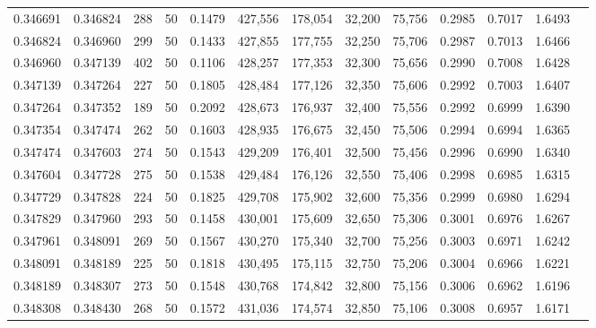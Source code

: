 \begin{tabular}{rrrrrrrrrrrrr}
0.346691 & 0.346824 &   288 &  50 &                                     0.1479 & 427,556 & 178,054 &  32,200 &  75,756 & 0.2985 & 0.7017 & 1.6493 \\
0.346824 & 0.346960 &   299 &  50 &                                     0.1433 & 427,855 & 177,755 &  32,250 &  75,706 & 0.2987 & 0.7013 & 1.6466 \\
0.346960 & 0.347139 &   402 &  50 &                                     0.1106 & 428,257 & 177,353 &  32,300 &  75,656 & 0.2990 & 0.7008 & 1.6428 \\
0.347139 & 0.347264 &   227 &  50 &                                     0.1805 & 428,484 & 177,126 &  32,350 &  75,606 & 0.2992 & 0.7003 & 1.6407 \\
0.347264 & 0.347352 &   189 &  50 &                                     0.2092 & 428,673 & 176,937 &  32,400 &  75,556 & 0.2992 & 0.6999 & 1.6390 \\
0.347354 & 0.347474 &   262 &  50 &                                     0.1603 & 428,935 & 176,675 &  32,450 &  75,506 & 0.2994 & 0.6994 & 1.6365 \\
0.347474 & 0.347603 &   274 &  50 &                                     0.1543 & 429,209 & 176,401 &  32,500 &  75,456 & 0.2996 & 0.6990 & 1.6340 \\
0.347604 & 0.347728 &   275 &  50 &                                     0.1538 & 429,484 & 176,126 &  32,550 &  75,406 & 0.2998 & 0.6985 & 1.6315 \\
0.347729 & 0.347828 &   224 &  50 &                                     0.1825 & 429,708 & 175,902 &  32,600 &  75,356 & 0.2999 & 0.6980 & 1.6294 \\
0.347829 & 0.347960 &   293 &  50 &                                     0.1458 & 430,001 & 175,609 &  32,650 &  75,306 & 0.3001 & 0.6976 & 1.6267 \\
0.347961 & 0.348091 &   269 &  50 &                                     0.1567 & 430,270 & 175,340 &  32,700 &  75,256 & 0.3003 & 0.6971 & 1.6242 \\
0.348091 & 0.348189 &   225 &  50 &                                     0.1818 & 430,495 & 175,115 &  32,750 &  75,206 & 0.3004 & 0.6966 & 1.6221 \\
0.348189 & 0.348307 &   273 &  50 &                                     0.1548 & 430,768 & 174,842 &  32,800 &  75,156 & 0.3006 & 0.6962 & 1.6196 \\
0.348308 & 0.348430 &   268 &  50 &                                     0.1572 & 431,036 & 174,574 &  32,850 &  75,106 & 0.3008 & 0.6957 & 1.6171 \\

\end{tabular}
